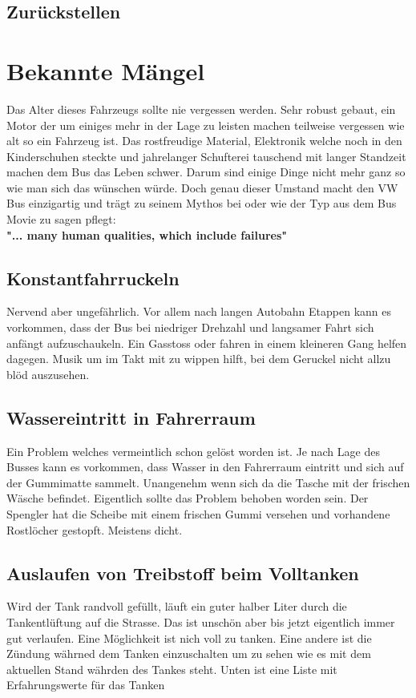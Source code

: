 \subsection{Zurückstellen}
\newpage
\section{Bekannte Mängel}
Das Alter dieses Fahrzeugs sollte nie vergessen werden. Sehr robust gebaut, ein Motor der um einiges mehr in der Lage zu leisten machen teilweise vergessen wie alt so ein Fahrzeug ist.
Das rostfreudige Material, Elektronik welche noch in den Kinderschuhen steckte und jahrelanger Schufterei tauschend mit langer Standzeit machen dem Bus das Leben schwer. 
Darum sind einige Dinge nicht mehr ganz so wie man sich das wünschen würde.
Doch genau dieser Umstand macht den VW Bus einzigartig und trägt zu seinem Mythos bei oder wie der Typ aus dem Bus Movie zu sagen pflegt:\\ \textbf{"... many human qualities, which include failures"}

\subsection{Konstantfahrruckeln}
Nervend aber ungefährlich.
Vor allem nach langen Autobahn Etappen kann es vorkommen, dass der Bus bei niedriger Drehzahl und langsamer Fahrt sich anfängt aufzuschaukeln.
Ein Gasstoss oder fahren in einem kleineren Gang helfen dagegen. Musik um im Takt mit zu wippen hilft, bei dem Geruckel nicht allzu blöd auszusehen.

\subsection{Wassereintritt in Fahrerraum}
Ein Problem welches vermeintlich schon gelöst worden ist. Je nach Lage des Busses kann es vorkommen, dass Wasser in den Fahrerraum eintritt und sich auf der Gummimatte sammelt. 
Unangenehm wenn sich da die Tasche mit der frischen Wäsche befindet. 
Eigentlich sollte das Problem behoben worden sein. 
Der Spengler hat die Scheibe mit einem frischen Gummi versehen und vorhandene Rostlöcher gestopft.
Meistens dicht.

\subsection{Auslaufen von Treibstoff beim Volltanken}\label{CHA_Volltanken}
Wird der Tank randvoll gefüllt, läuft ein guter halber Liter durch die Tankentlüftung auf die Strasse.
Das ist unschön aber bis jetzt eigentlich immer gut verlaufen.
Eine Möglichkeit ist nich voll zu tanken. 
Eine andere ist die Zündung währned dem Tanken einzuschalten um zu sehen wie es mit dem aktuellen Stand währden des Tankes steht.
Unten ist eine Liste mit Erfahrungswerte für das Tanken

